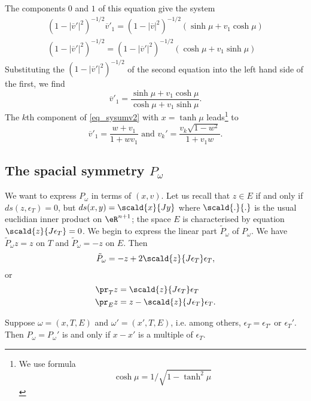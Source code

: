 The components $0$ and $1$ of this equation give the system
\begin{subequations}
\begin{align}
  (1-|\overline{v}'|^2)^{-1/2}\overline{v}'_1=(1-|\overline{v}|^2)^{-1/2}(\sinh\mu+v_1\cosh\mu)\\
 (1-|\overline{v}'|^2)^{-1/2}=(1-|\overline{v}'|^2)^{-1/2}(\cosh\mu+v_1\sinh\mu)
\end{align}
\end{subequations}
Substituting the $(1-|\overline{v}'|^2)^{-1/2}$ of the second equation into the left hand side of the first, we find
\[
  \overline{v}'_1=\frac{ \sinh\mu+v_1\cosh\mu }{ \cosh\mu+v_1\sinh\mu }.
\]
The $k$th component of \eqref{eq_sysumv2} with $x=\tanh\mu$ leads\footnote{We use formula
\[\cosh\mu=1/\sqrt{1-\tanh^2\mu}\]} to
\[
  \overline{v}'_1=\frac{ w+v_1 }{ 1+wv_1 }\text{ and } v_k'=\frac{ v_k\sqrt{1-w^2} }{ 1+v_1w }.
\]


\subsection{The spacial symmetry \texorpdfstring{$P_{\omega}$}{P}}

We want to express $P_{\omega}$ in terms of $(x,v)$. Let us recall that $z\in E$ if and only if $ds(z,\epsilon_T)=0$, but $ds(x,y)=\scald{ x }{ Jy }$ where $\scald{ . }{ . }$ is the usual euclidian inner product on $\eR^{n+1}$; the space $E$ is characterised by equation $\scald{ z }{ J\epsilon_T }=0$. We begin to express the linear part $\tilde P_{\omega}$ of $P_{\omega}$. We have $\tilde P_{\omega}z=z$ on $T$ and $\tilde P_{\omega}=-z$ on $E$. Then
\begin{equation}
\tilde P_{\omega}=-z+2\scald{ z }{ J\epsilon_T }\epsilon_T,
\end{equation}
or
\begin{subequations}
\begin{align}
  \pr_Tz&=\scald{ z }{ J\epsilon_T }\epsilon_T\\
 \pr_Ez&=z-\scald{ z }{ J\epsilon_T }\epsilon_T.
\end{align}
\end{subequations}

\begin{lemma}
Suppose $\omega=(x,T,E)$ and $\omega'=(x',T,E)$, i.e. among others, $\epsilon_T=\epsilon_{T'}$ or $\epsilon_{T}'$. Then $P_{\omega}=P_{\omega}'$ is and only if $x-x'$ is a multiple of $\epsilon_T$.
\end{lemma}

